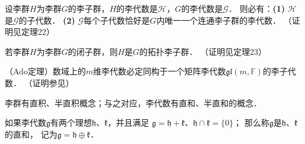 
\begin{theorem}\label{chlg:thm_suglieg}  %
    设李群$H$为李群$G$的李子群，$H$的李代数是$\mathscr{H}$，$G$的李代数是$\mathscr{G}$．
    则必有：{\bfseries (1)} $\mathscr{H}$是$\mathscr{G}$的子代数．
    {\bfseries (2)} $\mathscr{G}$每个子代数恰好是$G$内唯一一个连通李子群的李代数．
    （证明见\parencite[\S 3.8]{huangxg-2024}定理22）
\end{theorem}

\begin{theorem}\label{chlg:thm_subg-cartan}  %
    若李群$H$为李群$G$的闭子群，则$H$是$G$的拓扑李子群． （证明见\parencite[\S 3.8]{huangxg-2024}定理23） 
\end{theorem}





\begin{theorem}\label{chlg:thm_Ado}
    （Ado定理）数域上的$m$维李代数必定同构于一个矩阵李代数$\mathfrak{gl}(m,\mathbb{F})$的李子代数．
    （证明参见\parencite[\S 7.4]{Hilgert-2012}）
\end{theorem}



  

李群有直积、半直积概念；与之对应，李代数有直和、半直和的概念．

\begin{definition}
    如果李代数$\mathfrak{g}$有两个理想$\mathfrak{h}$、$\mathfrak{k}$，并且满足
    $\mathfrak{g}=\mathfrak{h}+\mathfrak{k}$、$\mathfrak{h}\cap\mathfrak{k}=\{0\}$；
    那么称$\mathfrak{g}$是$\mathfrak{h}$、$\mathfrak{k}$的{\heiti 直和}，
    记为$\mathfrak{g}=\mathfrak{h}\oplus\mathfrak{k}$．
\end{definition}


